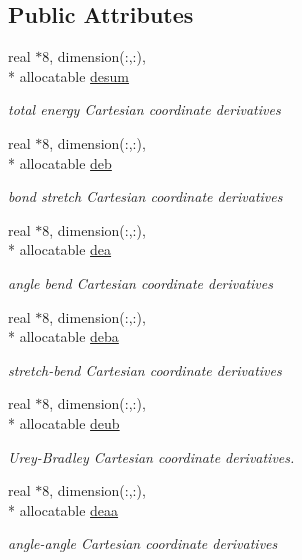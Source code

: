 \subsection*{Public Attributes}
\begin{DoxyCompactItemize}
\item 
real $\ast$8, dimension(\-:,\-:), \\*
allocatable \hyperlink{classderiv_ad23bdcc166a23b3529b9daef17b14260}{desum}
\begin{DoxyCompactList}\small\item\em total energy Cartesian coordinate derivatives \end{DoxyCompactList}\item 
real $\ast$8, dimension(\-:,\-:), \\*
allocatable \hyperlink{classderiv_adf3de30efcc38f11639ab87980898c1d}{deb}
\begin{DoxyCompactList}\small\item\em bond stretch Cartesian coordinate derivatives \end{DoxyCompactList}\item 
real $\ast$8, dimension(\-:,\-:), \\*
allocatable \hyperlink{classderiv_af26650de96064a2ee29f2892416d4994}{dea}
\begin{DoxyCompactList}\small\item\em angle bend Cartesian coordinate derivatives \end{DoxyCompactList}\item 
real $\ast$8, dimension(\-:,\-:), \\*
allocatable \hyperlink{classderiv_a479a8850d2549252355482a1a3b50894}{deba}
\begin{DoxyCompactList}\small\item\em stretch-\/bend Cartesian coordinate derivatives \end{DoxyCompactList}\item 
real $\ast$8, dimension(\-:,\-:), \\*
allocatable \hyperlink{classderiv_aba3704a824a9def0252571907bc6d11e}{deub}
\begin{DoxyCompactList}\small\item\em Urey-\/\-Bradley Cartesian coordinate derivatives. \end{DoxyCompactList}\item 
real $\ast$8, dimension(\-:,\-:), \\*
allocatable \hyperlink{classderiv_a179dc2259c330cf6181548c2d2ceee83}{deaa}
\begin{DoxyCompactList}\small\item\em angle-\/angle Cartesian coordinate derivatives \end{DoxyCompactList}\item 

\end{DoxyCompactItemize}
